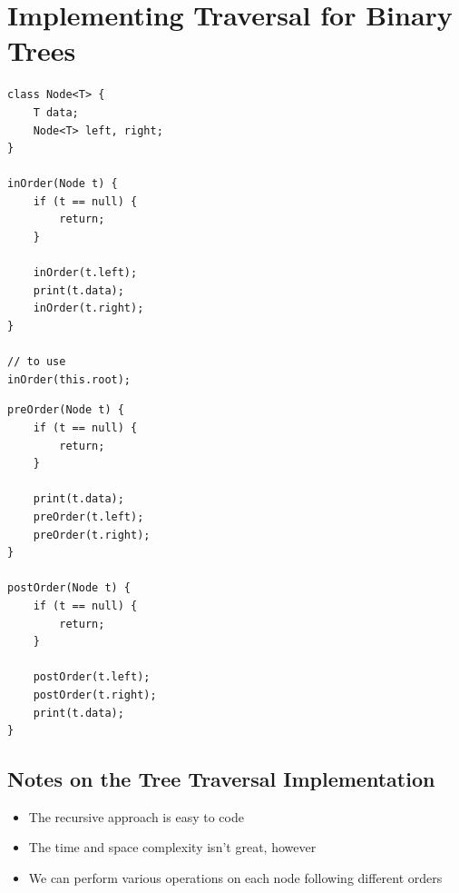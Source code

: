 \documentclass[10pt]{article}
\begin{document}
\section*{Implementing Traversal for Binary Trees}
\begin{minipage}[t]{0.5\linewidth}
\begin{verbatim}
class Node<T> {
    T data;
    Node<T> left, right;
}

inOrder(Node t) {
    if (t == null) {
        return;
    }

    inOrder(t.left);
    print(t.data);
    inOrder(t.right);
}

// to use
inOrder(this.root);
\end{verbatim}    
\end{minipage}%
\begin{minipage}[t]{0.5\linewidth}
\begin{verbatim}
preOrder(Node t) {
    if (t == null) {
        return;
    }

    print(t.data);
    preOrder(t.left);
    preOrder(t.right);
}

postOrder(Node t) {
    if (t == null) {
        return;
    }

    postOrder(t.left);
    postOrder(t.right);
    print(t.data);
}
\end{verbatim}    
\end{minipage}

\subsection*{Notes on the Tree Traversal Implementation}
\begin{itemize}
    \item The recursive approach is easy to code
    \item The time and space complexity isn't great, however
    \item We can perform various operations on each node following different orders
\end{itemize}
\end{document}
